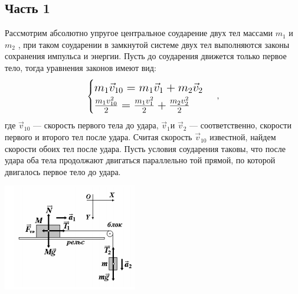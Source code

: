 \documentclass[12pt]{article}
\begin{document}
\subsection*{Часть 1}
Рассмотрим абсолютно упругое центральное соударение двух тел массами $m_{1}$  и $m_{2}$  , при таком соударении в замкнутой системе двух тел выполняются законы сохранения импульса и энергии. Пусть до соударения движется только первое тело, тогда уравнения законов имеют вид:
\begin{equation}
\Large
 \begin{cases}
   m_{1}\vec{v}_{10}=m_{1}\vec{v}_{1}+m_{2}\vec{v}_{2}\\
  \frac{ m_{1}v_{10}^2}{2}=\frac{ m_{1}v_{1}^2}{2}+\frac{ m_{2}v_{2}^2}{2}
 \end{cases},
\end{equation}
где $\vec{v}_{10}$ --- скорость первого тела до удара, $\vec{v}_{1}$и $\vec{v}_{2}$ --- соответственно, скорости первого и второго тел после удара. Считая скорость $\vec{v}_{10}$ известной, найдем скорости обоих тел после удара. Пусть условия соударения таковы, что после удара оба тела продолжают двигаться параллельно той прямой, по которой двигалось первое тело до удара. 
\begin{center}
\includegraphics{part2}
\end{center}
\end{document}
